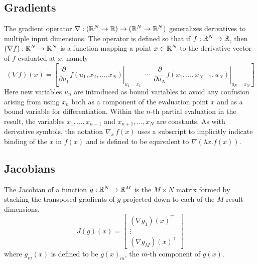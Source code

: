 \documentclass[10pt]{article}
\begin{document}
\subsection{Gradients}

The gradient operator $\nabla:(\mathbb{R}^N \rightarrow \mathbb{R})\rightarrow
(\mathbb{R}^N \rightarrow \mathbb{R}^N)$ generalizes derivatives to multiple
input dimensions.  The operator is defined so that if
$f : \mathbb{R}^N \rightarrow \mathbb{R}$, then $(\nabla f):\mathbb{R}^N \rightarrow
\mathbb{R}^N$ is a function mapping a point $x \in \mathbb{R}^N$ to the
derivative vector of $f$ evaluated at $x$, namely
%
\[
(\nabla f)(x) 
= 
\left[
  \left. 
    \frac{\partial}{\partial u_1} f(u_1,x_2,\ldots,x_N)
  \right|_{u_1 = x_1}
  \ \ \cdots \ \ 
  \left. 
    \frac{\partial}{\partial u_N}  f(x_1,\ldots,x_{N-1},u_N)
   \right|_{u_N = x_N}
\right]
\]
%
Here new variables $u_n$ are introduced as bound variables to avoid
any confusion arising from using $x_n$ both as a component of the
evaluation point $x$ and as a bound variable for differentiation.
Within the $n$-th partial evaluation in the result, the variables
$x_1,\ldots,x_{n-1}$ and $x_{n+1},\ldots,x_N$ are constants.  As with
derivative symbols, the notation $\nabla_{\!x} \, f(x)$ uses a
subscript to implicitly indicate binding of the $x$ in $f(x)$ and is
defined to be equivalent to $\nabla(\lambda x. f(x))$.

\subsection{Jacobians}

The Jacobian of a function $g : \mathbb{R}^N \rightarrow \mathbb{R}^M$ is 
the $M \times N$ matrix formed by stacking the transposed gradients of $g$ projected down to
each of the $M$ result dimensions,
%
\[
J(g)(x) = 
\left[
\begin{array}{c}
(\nabla g_1)(x)^{\top}
\\[2pt]
\vdots
\\[2pt]
(\nabla g_M)(x)^{\top}
\end{array}
\right]
\]
%
where $g_m(x)$ is defined to be $g(x)_m$, the $m$-th component of $g(x)$.

\clearpage
\nocite{Hogan:2014}
\nocite{Neal:2003}



\end{document}
